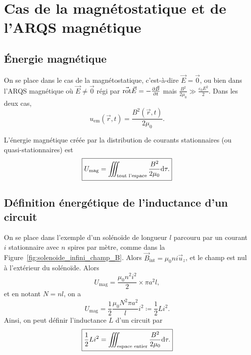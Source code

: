 \section[Cas de la magnétostatique]{Cas de la magnétostatique et de l'ARQS magnétique}
\subsection{Énergie magnétique}

On se place dans le cas de la magnétostatique, c'est-à-dire $\vec{E}=\vec{0}$, ou bien dans l'ARQS magnétique où $\vec{E}\neq\vec{0}$ régi par $\vec{\mathrm{rot}}\vec{E}=-\frac{\partial\vec{B}}{\partial t}$ mais $\frac{B^{2}}{2\mu_0}\gg\frac{\varepsilon_0 E^{2}}{2}$. Dans les deux cas,
\begin{equation}
    \boxed{
        u_{\mathrm{em}}(\vec{r},t)=\frac{B^{2}(\vec{r},t)}{2\mu_0}.
    }
\end{equation}

L'énergie magnétique créée par la distribution de courants stationnaires (ou quasi-stationnaires) est
\begin{equation}
    \boxed{
        U_{\mathrm{mag}}=\iiint_{\text{tout l'espace}}\frac{B^{2}}{2\mu_0}\mathrm{d}\tau.
    }
\end{equation}

\subsection{Définition énergétique de l'inductance d'un circuit}

On se place dans l'exemple d'un solénoïde de longueur $l$ parcouru par un courant $i$ stationnaire avec $n$ spires par mètre, comme dans la Figure~\ref{fig:solenoide_infini_champ_B}. Alors $\vec{B}_{\mathrm{int}}=\mu_0 ni\vec{u}_z$, et le champ est nul à l'extérieur du solénoïde. Alors
\begin{equation}
    U_{\mathrm{mag}}=\frac{\mu_0 n^{2}i^{2}}{2}\times\pi a^{2}l,
\end{equation}
et en notant $N=nl$, on a 
\begin{equation}
    \boxed{
        U_{\mathrm{mag}}=\frac{1}{2}\frac{\mu_0 N^{2}\pi a^{2}}{l}i^{2}\coloneqq\frac{1}{2}Li^{2}.
    }
\end{equation}
Ainsi, on peut définir l'inductance $L$ d'un circuit par 
\begin{equation}
    \boxed{
        \frac{1}{2}Li^{2}=\iiint_{\text{espace entier}}\frac{B^{2}}{2\mu_0}\mathrm{d}\tau.
    }
\end{equation}